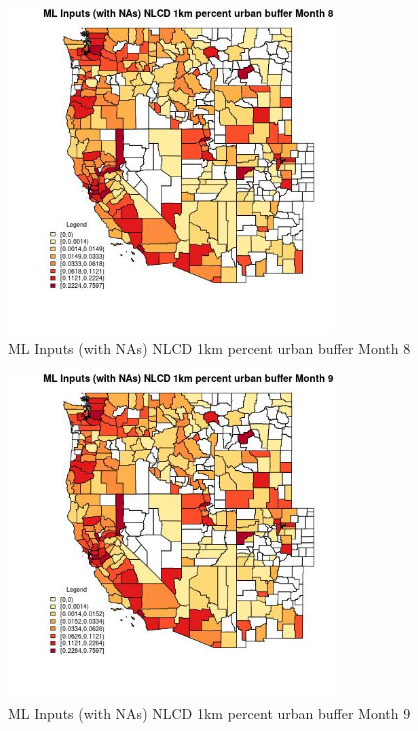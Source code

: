 \begin{figure} 
\centering  
\includegraphics[width=0.77\textwidth]{Code_Outputs/Report_ML_input_PM25_Step4_part_f_de_duplicated_aves_prioritize_24hr_obswNAs_CountyNLCD_1km_percent_urban_buffermedianMonth8.jpg} 
\caption{\label{fig:Report_ML_input_PM25_Step4_part_f_de_duplicated_aves_prioritize_24hr_obswNAsCountyNLCD_1km_percent_urban_buffermedianMonth8}ML Inputs (with NAs) NLCD 1km percent urban buffer Month 8} 
\end{figure} 
 

\begin{figure} 
\centering  
\includegraphics[width=0.77\textwidth]{Code_Outputs/Report_ML_input_PM25_Step4_part_f_de_duplicated_aves_prioritize_24hr_obswNAs_CountyNLCD_1km_percent_urban_buffermedianMonth9.jpg} 
\caption{\label{fig:Report_ML_input_PM25_Step4_part_f_de_duplicated_aves_prioritize_24hr_obswNAsCountyNLCD_1km_percent_urban_buffermedianMonth9}ML Inputs (with NAs) NLCD 1km percent urban buffer Month 9} 
\end{figure} 
 

